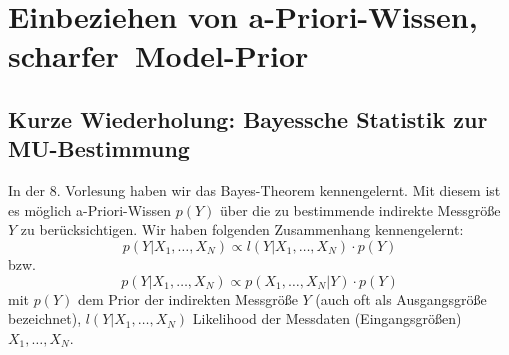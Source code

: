 

% 

\section{Einbeziehen von a-Priori-Wissen, \glqq scharfer\grqq ~Model-Prior}
\subsection{Kurze Wiederholung: Bayessche Statistik zur MU-Bestimmung}
In der 8. Vorlesung haben wir das Bayes-Theorem kennengelernt.
Mit diesem ist es möglich a-Priori-Wissen $p(Y)$ über die zu bestimmende indirekte Messgröße $Y$ zu berücksichtigen.
Wir haben folgenden Zusammenhang kennengelernt:
\begin{equation}
p(Y|X_1,\ldots,X_N) \propto l(Y|X_1,\ldots,X_N) \cdot p(Y)
\label{eq:BayesTheorem01}
\end{equation}
bzw.
\[
p(Y|X_1,\ldots,X_N) \propto p(X_1,\ldots,X_N|Y) \cdot p(Y)
\]
mit $p(Y)$ dem Prior der indirekten Messgröße $Y$ (auch oft als Ausgangsgröße bezeichnet), $l(Y|X_1,\ldots,X_N)$ Likelihood der Messdaten
(Eingangsgrößen) $X_1,\ldots,X_N$.

